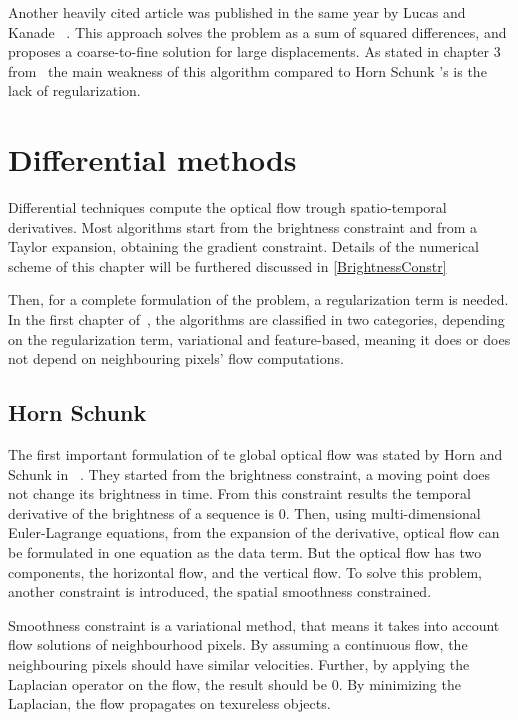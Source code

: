 \documentclass[12pt,a4paper,twoside]{report}
\begin{document}
Another heavily cited article was published in the same year by Lucas and Kanade ~\cite{lucas1981}. This approach solves the problem as a sum of squared differences, and proposes a coarse-to-fine solution for large displacements. As stated in chapter 3 from~\cite{mitiche2014computer} the main weakness of this algorithm compared to Horn Schunk 's is the lack of regularization.
 


\section{Differential methods}

Differential techniques compute the optical flow trough spatio-temporal derivatives.
Most algorithms start from the brightness constraint and from a Taylor expansion, obtaining the gradient constraint. Details of the numerical scheme of this chapter will be furthered discussed in \ref{BrightnessConstr}

Then, for a complete formulation of the problem, a regularization term is needed. In the first chapter of~\cite{wedel2011stereo}, the algorithms are classified in two categories, depending on the regularization term, variational and feature-based, meaning it does or does not depend on neighbouring pixels' flow computations.
\subsection{Horn Schunk}
The first important formulation of te global optical flow was stated by Horn and Schunk in ~\cite{HSOpticalFlow}. They started from the brightness constraint, a moving point does not change its brightness in time. From this constraint results the temporal derivative of the brightness of a sequence is $0$. Then,  using multi-dimensional Euler-Lagrange equations, from the expansion of the derivative, optical flow  can be formulated in one equation as the data term. But the optical flow has two components, the horizontal flow, and the vertical flow. To solve this problem, another constraint is introduced, the spatial smoothness constrained. 

Smoothness constraint is a variational method, that means it takes into account flow solutions of neighbourhood pixels. By assuming a continuous flow, the neighbouring pixels should have similar velocities\cite{HSOpticalFlow}. Further, by applying the Laplacian operator on the flow, the result should be 0. By minimizing the Laplacian, the flow propagates on texureless objects.
\end{document}
